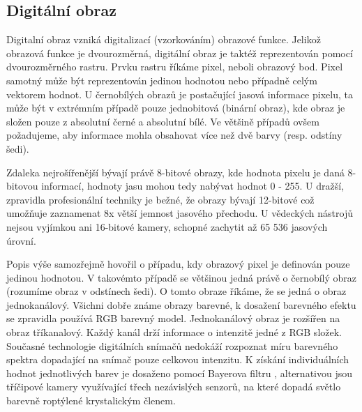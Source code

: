 \documentclass[czech, master, public, dept460, male, cpdeclaration, oneside]{diploma}
\begin{document}
\subsection{Digitální obraz}
Digitalní obraz vzniká digitalizací (vzorkováním) obrazové funkce. Jelikož obrazová funkce je dvourozměrná, digitální obraz je taktéž reprezentován pomocí dvourozměrného rastru. Prvku rastru říkáme pixel, neboli obrazový bod. Pixel samotný může být reprezentován jedinou hodnotou nebo případně celým vektorem hodnot. U černobílých obrazů je postačující jasová informace pixelu, ta může být v extrémním případě pouze jednobitová (binární obraz), kde obraz je složen pouze z absolutní černé a absolutní bílé. Ve většině případů ovšem požadujeme, aby informace mohla obsahovat více než dvě barvy (resp. odstíny šedi). \par
Zdaleka nejrošířenější bývají právě 8-bitové obrazy, kde hodnota pixelu je daná 8-bitovou informací, hodnoty jasu mohou tedy nabývat hodnot 0 - 255. U dražší, zpravidla profesionální techniky je bežné, že obrazy bývají 12-bitové což umožňuje zaznamenat 8x větší jemnost jasového přechodu. U vědeckých nástrojů nejsou vyjímkou ani 16-bitové kamery, schopné zachytit až 65 536 jasových úrovní. \par
Popis výše samozřejmě hovořil o případu, kdy obrazový pixel je definován pouze jedinou hodnotou. V takovémto případě se většinou jedná právě o černobílý obraz (rozumíme obraz v odstínech šedi). O tomto obraze říkáme, že se jedná o obraz jednokanálový. Všichni dobře známe obrazy barevné, k dosažení barevného efektu se zpravidla používá RGB barevný model. Jednokanálový obraz je rozšířen na obraz tříkanalový. Každý kanál drží informace o intenzitě jedné z RGB složek. Současné technologie digitálních snímačů nedokáží rozpoznat míru barevného spektra dopadající na snímač pouze celkovou intenzitu. K získání individuálních hodnot jednotlivých barev je dosaženo pomocí Bayerova filtru \cite{Bayer}, alternativou jsou tříčipové kamery využívající třech nezávislých senzorů, na které dopadá světlo barevně roptýlené krystalickým členem.
\end{document}
